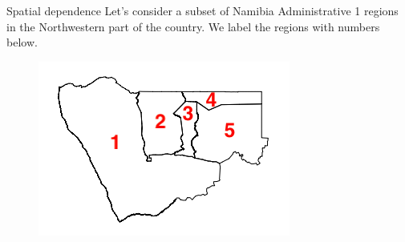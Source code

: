 \documentclass[10pt,t]{beamer}
\begin{document}
\begin{frame}{Spatial dependence}
Let's consider a subset of Namibia Administrative 1 regions in the Northwestern part of the country. We label the regions with numbers below.


\begin{figure}
	\centering \includegraphics[scale=0.4]{namibia_admin1_subset.png}
\end{figure}

\end{frame}
\end{document}
